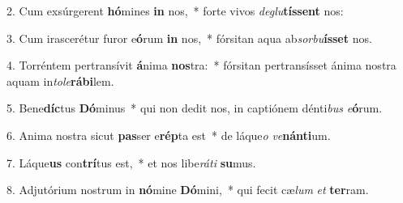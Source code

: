 2. Cum exsúrgerent \textbf{hó}mines \textbf{in} nos,~*  forte vivos \textit{de}\textit{glu}\textbf{tís}\textbf{sent} nos:\

3. Cum irascerétur furor e\textbf{ó}rum \textbf{in} nos,~*  fórsitan aqua ab\textit{sor}\textit{bu}\textbf{ís}\textbf{set} nos.\

4. Torréntem pertransívit \textbf{á}nima \textbf{nos}tra:~*  fórsitan pertransísset ánima nostra aquam in\textit{to}\textit{le}\textbf{rá}\textbf{bi}lem.\

5. Bene\textbf{díc}tus \textbf{Dó}minus~*  qui non dedit nos, in captiónem dénti\textit{bus} \textit{e}\textbf{ó}rum.\

6. Anima nostra sicut \textbf{pas}ser e\textbf{rép}ta est~*  de láque\textit{o} \textit{ve}\textbf{nán}\textbf{ti}um.\

7. Láque\textbf{us} con\textbf{trí}tus est,~*  et nos libe\textit{rá}\textit{ti} \textbf{su}mus.\

8. Adjutórium nostrum in \textbf{nó}mine \textbf{Dó}mini,~*  qui fecit cæ\textit{lum} \textit{et} \textbf{ter}ram.\

